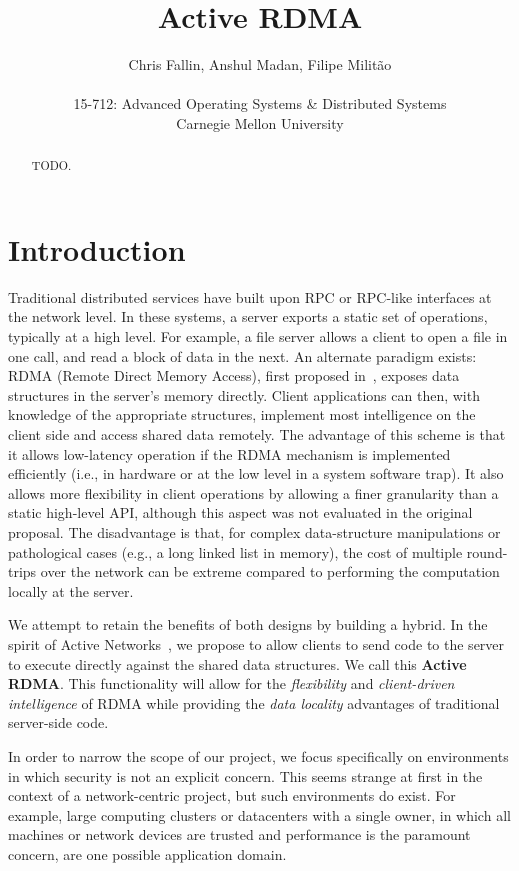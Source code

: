 \documentclass[10pt]{article}
\title{Active RDMA}
\author{Chris Fallin, Anshul Madan, Filipe Milit\~{a}o\\ \\
15-712: Advanced Operating Systems \&  Distributed Systems\\
Carnegie Mellon University}
\date{}
\begin{document}
\maketitle

\begin{abstract}
TODO.
\end{abstract}

\section{Introduction}

Traditional distributed services have built upon RPC or RPC-like
interfaces at the network level. In these systems, a server exports a
static set of operations, typically at a high level. For example, a
file server allows a client to open a file in one call, and read a
block of data in the next. An alternate paradigm exists: RDMA (Remote
Direct Memory Access), first proposed in~\cite{thekkath94}, exposes
data structures in the server's memory directly. Client applications
can then, with knowledge of the appropriate structures, implement most
intelligence on the client side and access shared data remotely. The
advantage of this scheme is that it allows low-latency operation if
the RDMA mechanism is implemented efficiently (i.e., in hardware or at
the low level in a system software trap). It also allows more
flexibility in client operations by allowing a finer granularity than
a static high-level API, although this aspect was not evaluated in the
original proposal. The disadvantage is that, for complex
data-structure manipulations or pathological cases (e.g., a long
linked list in memory), the cost of multiple round-trips over the
network can be extreme compared to performing the computation locally
at the server.

We attempt to retain the benefits of both designs by building a
hybrid. In the spirit of Active Networks~\cite{AN-survey}, we propose
to allow clients to send code to the server to execute directly
against the shared data structures. We call this \textbf{Active
  RDMA}. This functionality will allow for the \emph{flexibility} and
\emph{client-driven intelligence} of RDMA while providing the
\emph{data locality} advantages of traditional server-side code.

In order to narrow the scope of our project, we focus specifically on
environments in which security is not an explicit concern. This seems
strange at first in the context of a network-centric project, but
such environments do exist. For example, large computing clusters or
datacenters with a single owner, in which all machines or network
devices are trusted and performance is the paramount concern, are one
possible application domain.
\end{document}
